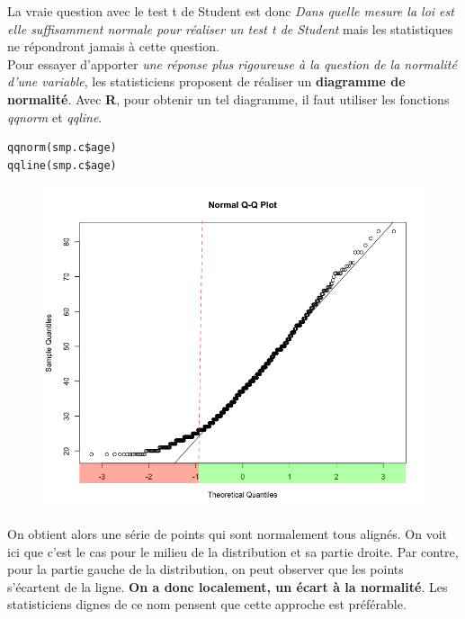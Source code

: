 La vraie question avec le test t de Student est donc \textit{Dans quelle mesure la loi est elle suffisamment normale pour réaliser un test t de Student} mais les statistiques ne répondront jamais à cette question.\newline
\\
Pour essayer d'apporter \textit{une réponse plus rigoureuse à la question de la normalité d'une variable}, les statisticiens proposent de réaliser un \textbf{diagramme de normalité}.\newline
Avec \textbf{R}, pour obtenir un tel diagramme, il faut utiliser les fonctions \textit{qqnorm} et \textit{qqline}.

\begin{lstlisting}[language=html]
qqnorm(smp.c$age)
qqline(smp.c$age)
\end{lstlisting}
\begin{figure}[H]\begin{center}\includegraphics[scale=0.5]{ilu/ce.png}\end{center}\end{figure}
On obtient alors une série de points qui sont normalement tous alignés. On voit ici que c'est le cas pour le milieu de la distribution et sa partie droite. Par contre, pour la partie gauche de la distribution, on peut observer que les points s'écartent de la ligne. \textbf{On a donc localement, un écart à la normalité}.\newline
Les statisticiens dignes de ce nom pensent que cette approche est préférable.\newline
